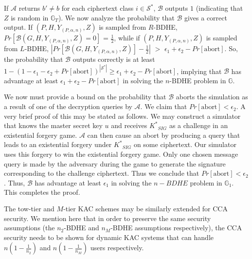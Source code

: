 If $\mathcal{A}$ returns $b' \neq b$ for each ciphertext class $i\in{\mathcal{S}}^{*}$, $\mathcal{B}$ outputs $1$ (indicating that $Z$ is random in $\mathbb{G}_T$). We now analyze the probability that $\mathcal{B}$ gives a correct output. If $(P,H,Y_{(P,\alpha,n)},Z)$ is sampled from $R$-BDHE, $Pr[\mathcal{B}(G,H,Y_{(P,\alpha,n)},Z)=0]$ = $\frac{1}{2}$, while if $(P,H,Y_{(P,\alpha,n)},Z)$ is sampled from $L$-BDHE, $|Pr[\mathcal{B}(G,H,Y_{(P,\alpha,n)},Z)]-\frac{1}{2}|$ $>$ $\epsilon_1+\epsilon_2-Pr[\text{abort}]$. So, the probability that $\mathcal{B}$ outputs correctly is at least $1-(1-\epsilon_1-\epsilon_2+Pr[\text{abort}])^{|{\mathcal{S}}^{*}|} \geq \epsilon_1+\epsilon_2-Pr[\text{abort}]$, implying that $\mathcal{B}$ has advantage at least $\epsilon_1+\epsilon_2-Pr[\text{abort}]$ in solving the $n$-BDHE problem in $\mathbb{G}$. 

We now must provide a bound on the probability that $\mathcal{B}$ aborts the simulation as a result of one of the decryption queries by $\mathcal{A}$. We claim that $Pr[\text{abort}]<\epsilon_2$. A very brief proof of this may be stated as follows. We may construct a simulator that knows the master secret key $u$ and receives ${K^{*}}_{SIG}$ as a challenge in an existential forgery game. $\mathcal{A}$ can then cause an abort by producing a query that leads to an existential forgery under ${K^{*}}_{SIG}$ on some ciphertext. Our simulator uses this forgery to win the existential forgery game. Only one chosen message query is made by the adversary during the game to generate the signature corresponding to the challenge ciphertext. Thus we conclude that $Pr[\text{abort}]<\epsilon_2$. Thus, $\mathcal{B}$ has advantage at least $\epsilon_1$ in solving the $n-BDHE$ problem in $\mathbb{G}_1$. This completes the proof. 

The tow-tier and $M$-tier KAC schemes may be similarly extended for CCA security. We mention here that in order to preserve the same security assumptions (the $n_2$-BDHE and $n_M$-BDHE assumptions respectively), the CCA security needs to be shown for dynamic KAC systems that can handle $n(1-\frac{1}{n_2})$ and $n(1-\frac{1}{n_M})$ users respectively.

